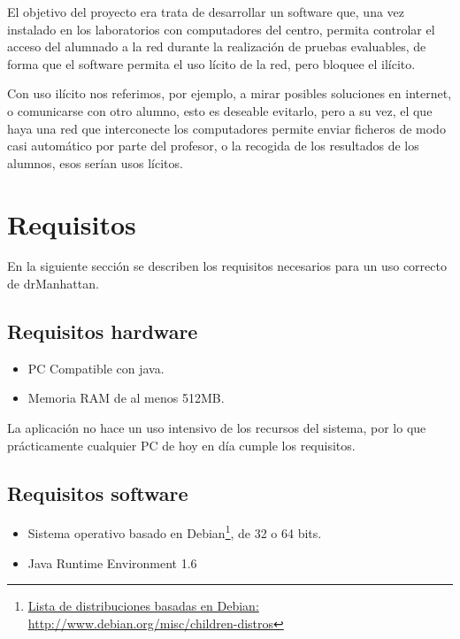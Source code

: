 \documentclass[11pt]{article}
\begin{document}
El objetivo del proyecto era trata de desarrollar un software que, una vez instalado en los laboratorios con computadores del centro, permita controlar el acceso del alumnado a la red durante la realización de pruebas evaluables, de forma que el software permita el uso lícito de la red, pero bloquee el ilícito.

Con uso ilícito nos referimos, por ejemplo, a mirar posibles soluciones en internet, o comunicarse con otro alumno, esto es deseable evitarlo, pero a su vez, el que haya una red que interconecte los computadores permite enviar ficheros de modo casi automático por parte del profesor, o la recogida de los resultados de los alumnos, esos serían usos lícitos.




\newpage

\section{Requisitos}

En la siguiente sección se describen los requisitos necesarios para un uso correcto de drManhattan.

\subsection{Requisitos hardware}

\begin{itemize}

    \item PC Compatible con java.

    \item Memoria RAM de al menos 512MB.

\end{itemize}

La aplicación no hace un uso intensivo de los recursos del sistema, por lo que prácticamente cualquier PC de hoy en día cumple los requisitos.


\subsection{Requisitos software}

\begin{itemize}

    \item Sistema operativo basado en Debian\footnote{\href{http://www.debian.org/misc/children-distros}{Lista de distribuciones basadas en Debian: http://www.debian.org/misc/children-distros}}, de 32 o 64 bits.

    \item Java Runtime Environment 1.6

\end{itemize}
\end{document}
